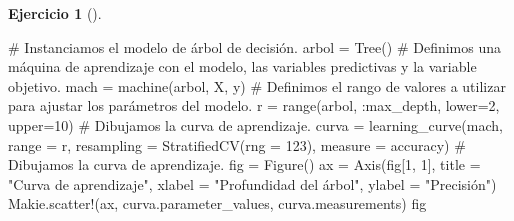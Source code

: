\documentclass[
  a4paper,
]{scrreport}
\newenvironment{Shaded}{\begin{snugshade}}{\end{snugshade}}
\newcommand{\CommentTok}[1]{\textcolor[rgb]{0.37,0.37,0.37}{#1}}
\newcommand{\FloatTok}[1]{\textcolor[rgb]{0.68,0.00,0.00}{#1}}
\newcommand{\FunctionTok}[1]{\textcolor[rgb]{0.28,0.35,0.67}{#1}}
\newcommand{\NormalTok}[1]{\textcolor[rgb]{0.00,0.23,0.31}{#1}}
\newcommand{\OperatorTok}[1]{\textcolor[rgb]{0.37,0.37,0.37}{#1}}
\newcommand{\StringTok}[1]{\textcolor[rgb]{0.13,0.47,0.30}{#1}}
\theoremstyle{definition}
\newtheorem{exercise}{Ejercicio}[chapter]
\theoremstyle{remark}
\begin{document}
\begin{exercise}[]
\begin{enumerate}
  \begin{tcolorbox}[enhanced jigsaw, left=2mm, colback=white, coltitle=black, opacitybacktitle=0.6, titlerule=0mm, breakable, bottomrule=.15mm, toptitle=1mm, bottomtitle=1mm, colbacktitle=quarto-callout-tip-color!10!white, opacityback=0, rightrule=.15mm, title=\textcolor{quarto-callout-tip-color}{\faLightbulb}\hspace{0.5em}{Solución}, colframe=quarto-callout-tip-color-frame, arc=.35mm, leftrule=.75mm, toprule=.15mm]

\begin{Shaded}
\begin{Highlighting}[]
\CommentTok{\# Instanciamos el modelo de árbol de decisión.}
\NormalTok{arbol }\OperatorTok{=} \FunctionTok{Tree}\NormalTok{()}
\CommentTok{\# Definimos una máquina de aprendizaje con el modelo, las variables predictivas y la variable objetivo.}
\NormalTok{mach }\OperatorTok{=} \FunctionTok{machine}\NormalTok{(arbol, X, y)}
\CommentTok{\# Definimos el rango de valores a utilizar para ajustar los parámetros del modelo.}
\NormalTok{r }\OperatorTok{=} \FunctionTok{range}\NormalTok{(arbol, }\OperatorTok{:}\NormalTok{max\_depth, lower}\OperatorTok{=}\FloatTok{2}\NormalTok{, upper}\OperatorTok{=}\FloatTok{10}\NormalTok{)}
\CommentTok{\# Dibujamos la curva de aprendizaje.}
\NormalTok{curva }\OperatorTok{=} \FunctionTok{learning\_curve}\NormalTok{(mach, range }\OperatorTok{=}\NormalTok{ r, resampling }\OperatorTok{=} \FunctionTok{StratifiedCV}\NormalTok{(rng }\OperatorTok{=} \FloatTok{123}\NormalTok{), measure }\OperatorTok{=}\NormalTok{ accuracy)}
\CommentTok{\# Dibujamos la curva de aprendizaje.}
\NormalTok{fig }\OperatorTok{=} \FunctionTok{Figure}\NormalTok{()}
\NormalTok{ax }\OperatorTok{=} \FunctionTok{Axis}\NormalTok{(fig[}\FloatTok{1}\NormalTok{, }\FloatTok{1}\NormalTok{], title }\OperatorTok{=} \StringTok{"Curva de aprendizaje"}\NormalTok{, xlabel }\OperatorTok{=} \StringTok{"Profundidad del árbol"}\NormalTok{, ylabel }\OperatorTok{=} \StringTok{"Precisión"}\NormalTok{)}
\NormalTok{Makie.}\FunctionTok{scatter!}\NormalTok{(ax, curva.parameter\_values, curva.measurements)}
\NormalTok{fig}
\end{Highlighting}
\end{Shaded}


\end{tcolorbox}
\end{enumerate}
\end{exercise}
\end{document}
